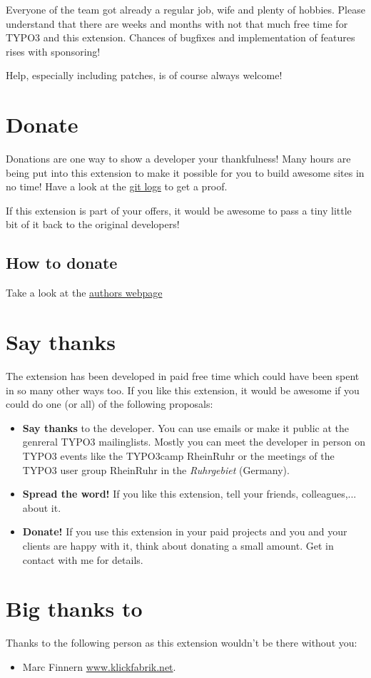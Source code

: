 \documentclass[a4paper,10pt,english]{sphinxtypo3manual}
\begin{document}
Everyone of the team got already a regular job, wife and plenty of
hobbies. Please understand that there are weeks and months with not
that much free time for TYPO3 and this extension. Chances of bugfixes
and implementation of features rises with sponsoring!

Help, especially including patches, is of course always welcome!


\section{Donate}
\label{index:donate}
Donations are one way to show a developer your thankfulness!
Many hours are being put into this extension to make it possible
for you to build awesome sites in no time!
Have a look at the \href{http://git.typo3.org/TYPO3v4/Extensions/addresslist4cal.git?a=shortlog}{git logs}  to get a proof.

If this extension is part of your offers, it would be awesome to pass
a tiny little bit of it back to the original developers!


\subsection{How to donate}
\label{index:how-to-donate}
Take a look at the \href{http://www.oehlhof.de/T3/typo3-cms.html}{authors webpage}


\section{Say thanks}
\label{index:authors-webpage}\label{index:say-thanks}
The extension has been developed in paid free time which
could have been spent in so many other ways too. If you like this
extension, it would be awesome if you could do one (or all) of the
following proposals:
\begin{itemize}
\item {} 
\textbf{Say thanks} to the developer. You can use emails or make it public at
the genreral TYPO3 mailinglists. Mostly you can meet the developer in person
on TYPO3 events like the TYPO3camp RheinRuhr or the meetings of the TYPO3
user group RheinRuhr in the \emph{Ruhrgebiet} (Germany).

\item {} 
\textbf{Spread the word!} If you like this extension, tell your friends,
colleagues,... about it.

\item {} 
\textbf{Donate!} If you use this extension in your paid projects and you and your
clients are happy with it, think about donating a small amount.
Get in contact with me for details.

\end{itemize}


\section{Big thanks to}
\label{index:big-thanks-to}
Thanks to the following person as this extension wouldn't be there without you:
\begin{itemize}
\item {} 
Marc Finnern \href{http://www.klickfabrik.net/}{www.klickfabrik.net}.

\end{itemize}



\renewcommand{\indexname}{Index}
\printindex
\end{document}
